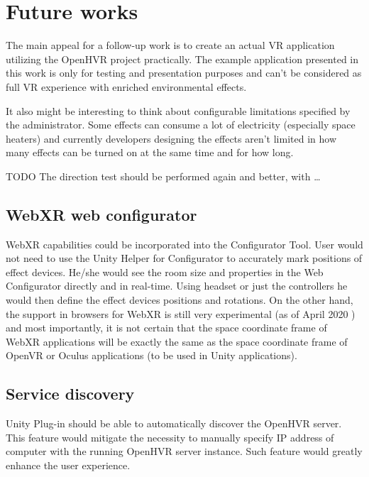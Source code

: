 \chapter{Future works}
The main appeal for a follow-up work is to create an actual VR application
utilizing the OpenHVR project practically. The example application presented in this
work is only for testing and presentation purposes and can’t be considered as
full VR experience with enriched environmental effects.


It also might be interesting to think about configurable limitations specified
by the administrator.
Some effects can consume a lot of electricity (especially space heaters)
and currently developers designing the effects aren’t limited in how many
effects can be turned on at the same time and for how long.


{TODO} The direction test should be performed again and better, with …​


\hypertarget{x-webxr-web-configurator}{\section{WebXR web configurator}}
WebXR capabilities could be incorporated into the Configurator Tool.
User would not need to use the Unity Helper for Configurator to accurately
mark positions of effect devices. He/she would see the room
size and properties in the Web Configurator directly and
in real-time. Using headset or just the controllers he would then define
the effect devices positions and rotations. On the other hand, the support in
browsers for WebXR is still very experimental (as of April 2020 \hyperlink{webxr}{}) and
most importantly, it is not certain that the space coordinate frame of
WebXR applications will be exactly the same as the space coordinate frame
of OpenVR or Oculus applications (to be used in Unity applications).


\hypertarget{x-service-discovery}{\section{Service discovery}}
Unity Plug-in should be able to automatically discover the OpenHVR server.
This feature would mitigate the necessity to manually specify IP address
of computer with the running OpenHVR server instance. Such feature would
greatly enhance the user experience.